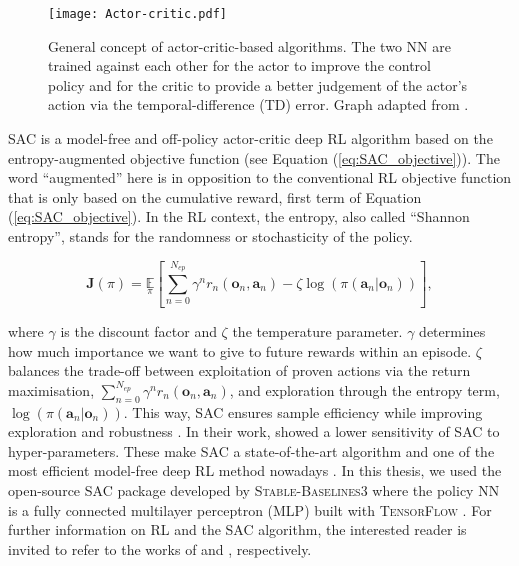 \begin{figure}[!htbp]
\centering
\texttt{[image: Actor-critic.pdf]}
\caption{General concept of actor-critic-based algorithms. The two \gls{NN} are trained against each other for the actor to improve the control policy and for the critic to provide a better judgement of the actor's action via the temporal-difference (TD) error. Graph adapted from \cite{cao2020reinforcement}.}
\label{fig:Actor-critic}
\end{figure}

\gls{SAC} is a model-free and off-policy actor-critic deep \gls{RL} algorithm based on the entropy-augmented objective function (see Equation (\ref{eq:SAC_objective})). The word ``augmented'' here is in opposition to the conventional \gls{RL} objective function that is only based on the cumulative reward, \ie first term of Equation (\ref{eq:SAC_objective}). In the \gls{RL} context, the entropy, also called ``Shannon entropy'', stands for the randomness or stochasticity of the policy.

\begin{equation}
    \label{eq:SAC_objective}
    \bm{J}(\pi) = \underset{\pi}{\mathbb{E}}\left[\underset{n=0}{\overset{N_{ep}}{\sum}}\gamma^n r_n\left(\bm{o}_n,\bm{a}_n \right) - \zeta \log \left(\pi\left(\bm{a}_n | \bm{o}_n\right) \right) \right],
\end{equation}

\noindent
where $\gamma$ is the discount factor and $\zeta$ the temperature parameter. $\gamma$ determines how much importance we want to give to future rewards within an episode. $\zeta$ balances the trade-off between exploitation of proven actions via the return maximisation, \ie $\sum_{n=0}^{N_{ep}}\gamma^n r_n\left(\bm{o}_n,\bm{a}_n \right)$, and exploration through the entropy term, \ie $\log \left(\pi\left(\bm{a}_n | \bm{o}_n\right) \right)$. This way, \gls{SAC} ensures sample efficiency while improving exploration \cite{haarnoja2017reinforcement} and robustness \cite{ziebart2010modeling}. In their work, \citet{haarnoja2017reinforcement} showed a lower sensitivity of \gls{SAC} to hyper-parameters. These make \gls{SAC} a state-of-the-art algorithm and one of the most efficient model-free deep RL method nowadays \cite{haarnoja2017reinforcement}. In this thesis, we used the open-source \gls{SAC} package developed by \textsc{Stable-Baselines3} \cite{raffin2021stable} where the policy \gls{NN} is a fully connected multilayer perceptron (MLP) built with \textsc{TensorFlow} \cite{abadi2016tensorflow}. For further information on \gls{RL} and the \gls{SAC} algorithm, the interested reader is invited to refer to the works of \citet{sutton2018reinforcement} and \citet{haarnoja2018soft}, respectively.

